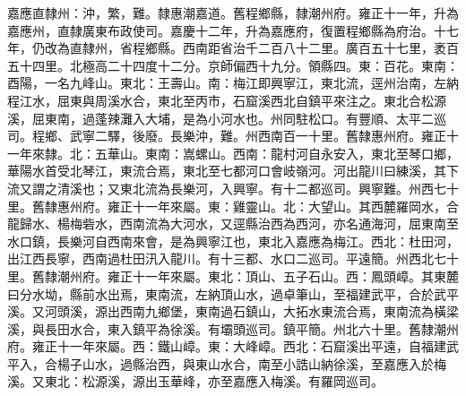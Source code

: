 \begin{pinyinscope}
嘉應直隸州：沖，繁，難。隸惠潮嘉道。舊程鄉縣，隸潮州府。雍正十一年，升為嘉應州，直隸廣東布政使司。嘉慶十二年，升為嘉應府，復置程鄉縣為府治。十七年，仍改為直隸州，省程鄉縣。西南距省治千二百八十二里。廣百五十七里，袤百五十四里。北極高二十四度十二分。京師偏西十九分。領縣四。東：百花。東南：酉陽，一名九峰山。東北：王壽山。南：梅江即興寧江，東北流，逕州治南，左納程江水，屈東與周溪水合，東北至丙市，石窟溪西北自鎮平來注之。東北合松源溪，屈東南，過蓬辣灘入大埔，是為小河水也。州同駐松口。有豐順、太平二巡司。程鄉、武寧二驛，後廢。長樂沖，難。州西南百一十里。舊隸惠州府。雍正十一年來隸。北：五華山。東南：嵩螺山。西南：龍村河自永安入，東北至琴口鄉，華陽水首受北琴江，東流合焉，東北至七都河口會岐嶺河。河出龍川曰練溪，其下流又謂之清溪也；又東北流為長樂河，入興寧。有十二都巡司。興寧難。州西七十里。舊隸惠州府。雍正十一年來屬。東：雞靈山。北：大望山。其西麓羅岡水，合龍歸水、楊梅砦水，西南流為大河水，又逕縣治西為西河，亦名通海河，屈東南至水口鎮，長樂河自西南來會，是為興寧江也，東北入嘉應為梅江。西北：杜田河，出江西長寧，西南過杜田汛入龍川。有十三都、水口二巡司。平遠簡。州西北七十里。舊隸潮州府。雍正十一年來屬。東北：頂山、五子石山。西：鳳頭嶂。其東麓曰分水坳，縣前水出焉，東南流，左納頂山水，過卓筆山，至福建武平，合於武平溪。又河頭溪，源出西南九鄉堡，東南過石鎮山，大拓水東流合焉，東南流為橫梁溪，與長田水合，東入鎮平為徐溪。有壩頭巡司。鎮平簡。州北六十里。舊隸潮州府。雍正十一年來屬。西：鐵山嶂。東：大峰嶂。西北：石窟溪出平遠，自福建武平入，合楊子山水，過縣治西，與東山水合，南至小誥山納徐溪，至嘉應入於梅溪。又東北：松源溪，源出玉華峰，亦至嘉應入梅溪。有羅岡巡司。


\end{pinyinscope}
